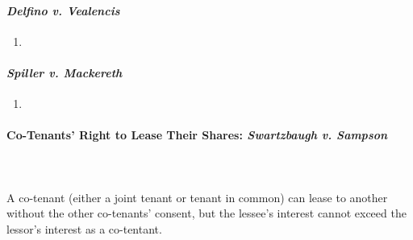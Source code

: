\paragraph{\emph{Delfino v. Vealencis}}

\begin{enumerate}
    \item %
\end{enumerate}

\paragraph{\emph{Spiller v. Mackereth}}

\begin{enumerate}
    \item %
\end{enumerate}

\paragraph{Co-Tenants' Right to Lease Their Shares: \emph{Swartzbaugh v. 
Sampson}}
~\\\\
A co-tenant (either a joint tenant or tenant in common)  can lease to another 
without the other co-tenants' consent, but the lessee's interest cannot exceed 
the lessor's interest as a co-tentant.

